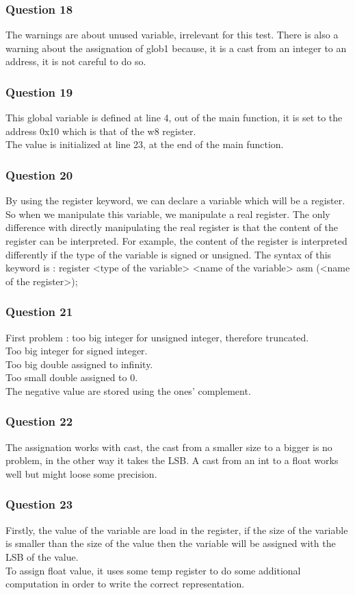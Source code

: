 \documentclass[a4paper,10pt]{article}
\begin{document}
\subsubsection*{Question 18}
The warnings are about unused variable, irrelevant for this test. There is also a warning about the assignation of glob1 because, it is a cast from an integer to an address, it is not careful to do so.

\subsubsection*{Question 19}
This global variable is defined at line 4, out of the main function, it is set to the address 0x10 which is that of the w8 register.\\
The value is initialized at line 23, at the end of the main function.

\subsubsection*{Question 20}
By using the register keyword, we can declare a variable which will be a register. So when we manipulate this variable, we manipulate a real register. The only difference with directly manipulating the real register is that the content of the register can be interpreted. For example, the content of the register is interpreted differently if the type of the variable is signed or unsigned. The syntax of this keyword is : register <type of the variable> <name of the variable> asm (<name of the register>);

\subsubsection*{Question 21}
First problem : too big integer for unsigned integer, therefore truncated.\\
Too big integer for signed integer.\\
Too big double assigned to infinity.\\
Too small double assigned to 0.\\
The negative value are stored using the ones' complement.

\subsubsection*{Question 22}
The assignation works with cast, the cast from a smaller size to a bigger is no problem, in the other way it takes the LSB. A cast from an int to a float works well but might loose some precision.

\subsubsection*{Question 23}
Firstly, the value of the variable are load in the register, if the size of the variable is smaller than the size of the value then the variable will be assigned with the LSB of the value.\\
To assign float value, it uses some temp register to do some additional computation in order to write the correct representation.
\end{document}
